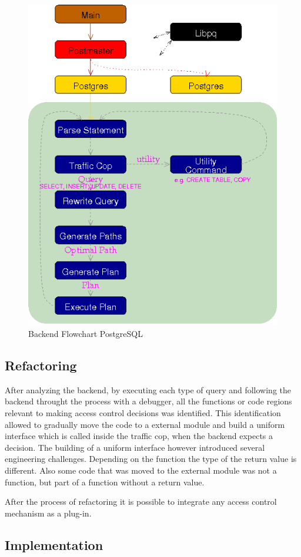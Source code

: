 %
\begin{figure}[!ht]
  \centering
    \includegraphics[width=1\textwidth]{img/backend_flowchart.png}
    \caption{Backend Flowchart PostgreSQL \protect \footnotemark}
\end{figure}
%
%
\FloatBarrier
%
\subsection{Refactoring}
%
After analyzing the backend, by executing each type of query and following the backend throught the process with a debugger, all the functions or code regions relevant to making access control decisions was identified.
%
This identification allowed to gradually move the code to a external module and build a uniform interface which is called inside the traffic cop, when the backend expects a decision.
%
The building of a uniform interface however introduced several engineering challenges.
%
Depending on the function the type of the return value is different. Also some code that was moved to the external module was not a function, but part of a function without a return value.
%

%
After the process of refactoring it is possible to integrate any access control mechanism as a plug-in.
%

%
\subsection{Implementation}